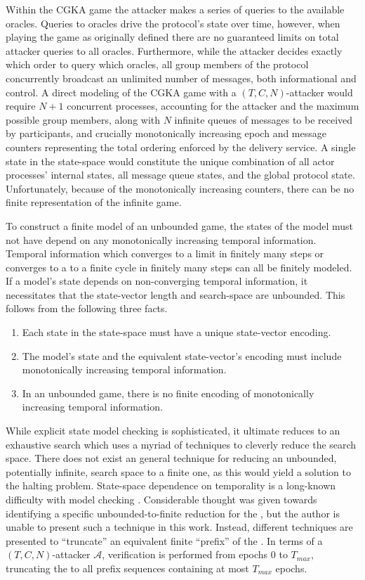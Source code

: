 Within the CGKA game the attacker makes a series of queries to the available oracles.
Queries to oracles drive the  protocol's state over time, however, when playing the game as originally defined there are no guaranteed limits on total attacker queries to all oracles.
Furthermore, while the attacker decides exactly which order to query which oracles, all group members of the  protocol concurrently broadcast an unlimited number of messages, both informational and control.
A direct modeling of the CGKA game with a \((T, C, N)\)-attacker would require \(N+1\) concurrent processes, accounting for the attacker and the maximum possible group members, along with \(N\) infinite queues of messages to be received by participants, and crucially monotonically increasing epoch and message counters representing the total ordering enforced by the delivery service.
A single state in the state-space would constitute the unique combination of all actor processes' internal states, all message queue states, and the global protocol state.
Unfortunately, because of the monotonically increasing counters, there can be no finite representation of the infinite game.

To construct a finite model of an unbounded game, the states of the model must not have depend on any monotonically increasing temporal information.
Temporal information which converges to a limit in finitely many steps or converges to a to a finite cycle in finitely many steps can all be finitely modeled.
If a model's state depends on non-converging temporal information, it necessitates that the state-vector length and search-space are unbounded.
This follows from the following three facts.

\begin{enumerate}
\def\labelenumi{\arabic{enumi}.}
\item Each state in the state-space must have a unique state-vector encoding.
\item The model's state and the equivalent state-vector's encoding must include monotonically increasing temporal information.
\item In an unbounded game, there is no finite encoding of monotonically increasing temporal information.
\end{enumerate}

While explicit state model checking is sophisticated, it ultimate reduces to an exhaustive search which uses a myriad of techniques to cleverly reduce the search space.
There does not exist an general technique for reducing an unbounded, potentially infinite, search space to a finite one, as this would yield a solution to the halting problem.
State-space dependence on temporality is a long-known difficulty with model checking \autocite{henzinger1994symbolic}.
Considerable thought was given towards identifying a specific unbounded-to-finite reduction for the \CGKAsec, but the author is unable to present such a technique in this work.
Instead, different techniques are presented to ``truncate'' an equivalent finite ``prefix'' of the \CGKAsec.
In terms of a \((T, C, N)\)-attacker \(\mathcal{A}\), verification is performed from epochs $0$ to \(T_{max}\), truncating the \CGKAsec to all prefix sequences containing at most \(T_{max}\) epochs.

